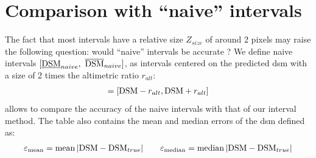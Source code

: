 \section{Comparison with ``naive'' intervals}
The fact that most intervals have a relative size $Z_{size}$ of around 2 pixels may raise the following question: would ``naive'' intervals be accurate ? We define naive intervals $[\underline{\mathrm{DSM}}_{naive}, ~\overline{\mathrm{DSM}}_{naive}]$, as intervals centered on the predicted \acrshort{dsm} with a size of 2 times the altimetric ratio $r_{alt}$:
\begin{align}
    [\underline{\DSM}_{naive}, ~\overline{\DSM}_{naive}] = [\DSM-r_{alt}, \DSM+r_{alt}]
\end{align}
 allows to compare the accuracy of the naive intervals with that of our interval method. The table also contains the mean and median errors of the \acrshort{dsm} defined as:
\begin{align}
    \varepsilon_{\operatorname*{mean}} = \operatorname*{mean}|\mathrm{DSM} - \mathrm{DSM}_{true}|\qquad \varepsilon_{\operatorname*{median}} = \operatorname*{median}|\mathrm{DSM} - \mathrm{DSM}_{true}|
\end{align}

